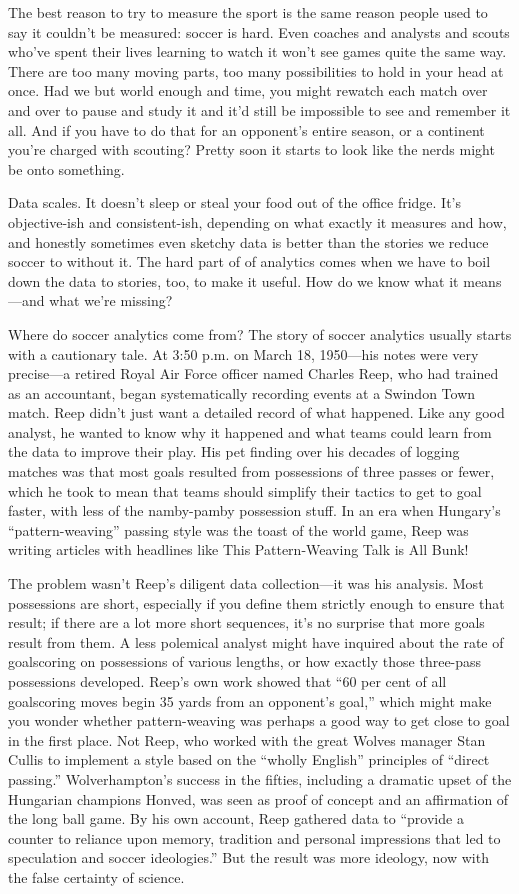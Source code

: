 The best reason to try to measure the sport is the same reason people used to say it couldn’t be measured: soccer is hard. Even coaches and analysts and scouts who’ve spent their lives learning to watch it won’t see games quite the same way. There are too many moving parts, too many possibilities to hold in your head at once. Had we but world enough and time, you might rewatch each match over and over to pause and study it and it’d still be impossible to see and remember it all. And if you have to do that for an opponent’s entire season, or a continent you’re charged with scouting? Pretty soon it starts to look like the nerds might be onto something.

Data scales. It doesn’t sleep or steal your food out of the office fridge. It’s objective-ish and consistent-ish, depending on what exactly it measures and how, and honestly sometimes even sketchy data is better than the stories we reduce soccer to without it. The hard part of of analytics comes when we have to boil down the data to stories, too, to make it useful. How do we know what it means—and what we’re missing?

Where do soccer analytics come from?
The story of soccer analytics usually starts with a cautionary tale. At 3:50 p.m. on March 18, 1950—his notes were very precise—a retired Royal Air Force officer named Charles Reep, who had trained as an accountant, began systematically recording events at a Swindon Town match. Reep didn’t just want a detailed record of what happened. Like any good analyst, he wanted to know why it happened and what teams could learn from the data to improve their play. His pet finding over his decades of logging matches was that most goals resulted from possessions of three passes or fewer, which he took to mean that teams should simplify their tactics to get to goal faster, with less of the namby-pamby possession stuff. In an era when Hungary’s “pattern-weaving” passing style was the toast of the world game, Reep was writing articles with headlines like This Pattern-Weaving Talk is All Bunk!

The problem wasn’t Reep’s diligent data collection—it was his analysis. Most possessions are short, especially if you define them strictly enough to ensure that result; if there are a lot more short sequences, it’s no surprise that more goals result from them. A less polemical analyst might have inquired about the rate of goalscoring on possessions of various lengths, or how exactly those three-pass possessions developed. Reep’s own work showed that “60 per cent of all goalscoring moves begin 35 yards from an opponent’s goal,” which might make you wonder whether pattern-weaving was perhaps a good way to get close to goal in the first place. Not Reep, who worked with the great Wolves manager Stan Cullis to implement a style based on the “wholly English” principles of “direct passing.” Wolverhampton’s success in the fifties, including a dramatic upset of the Hungarian champions Honved, was seen as proof of concept and an affirmation of the long ball game. By his own account, Reep gathered data to “provide a counter to reliance upon memory, tradition and personal impressions that led to speculation and soccer ideologies.” But the result was more ideology, now with the false certainty of science.

